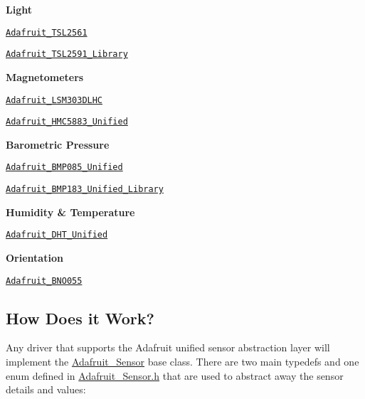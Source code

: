 {\bfseries Light}
\begin{DoxyItemize}
\item \href{https://github.com/adafruit/Adafruit_TSL2561}{\tt Adafruit\+\_\+\+T\+S\+L2561}
\item \href{https://github.com/adafruit/Adafruit_TSL2591_Library}{\tt Adafruit\+\_\+\+T\+S\+L2591\+\_\+\+Library}
\end{DoxyItemize}

{\bfseries Magnetometers}
\begin{DoxyItemize}
\item \href{https://github.com/adafruit/Adafruit_LSM303DLHC}{\tt Adafruit\+\_\+\+L\+S\+M303\+D\+L\+HC}
\item \href{https://github.com/adafruit/Adafruit_HMC5883_Unified}{\tt Adafruit\+\_\+\+H\+M\+C5883\+\_\+\+Unified}
\end{DoxyItemize}

{\bfseries Barometric Pressure}
\begin{DoxyItemize}
\item \href{https://github.com/adafruit/Adafruit_BMP085_Unified}{\tt Adafruit\+\_\+\+B\+M\+P085\+\_\+\+Unified}
\item \href{https://github.com/adafruit/Adafruit_BMP183_Unified_Library}{\tt Adafruit\+\_\+\+B\+M\+P183\+\_\+\+Unified\+\_\+\+Library}
\end{DoxyItemize}

{\bfseries Humidity \& Temperature}
\begin{DoxyItemize}
\item \href{https://github.com/adafruit/Adafruit_DHT_Unified}{\tt Adafruit\+\_\+\+D\+H\+T\+\_\+\+Unified}
\end{DoxyItemize}

{\bfseries Orientation}
\begin{DoxyItemize}
\item \href{https://github.com/adafruit/Adafruit_BNO055}{\tt Adafruit\+\_\+\+B\+N\+O055}
\end{DoxyItemize}

\subsection*{How Does it Work?}

Any driver that supports the Adafruit unified sensor abstraction layer will implement the \hyperlink{class_adafruit___sensor}{Adafruit\+\_\+\+Sensor} base class. There are two main typedefs and one enum defined in \hyperlink{_adafruit___sensor_8h}{Adafruit\+\_\+\+Sensor.\+h} that are used to \textquotesingle{}abstract\textquotesingle{} away the sensor details and values\+:

